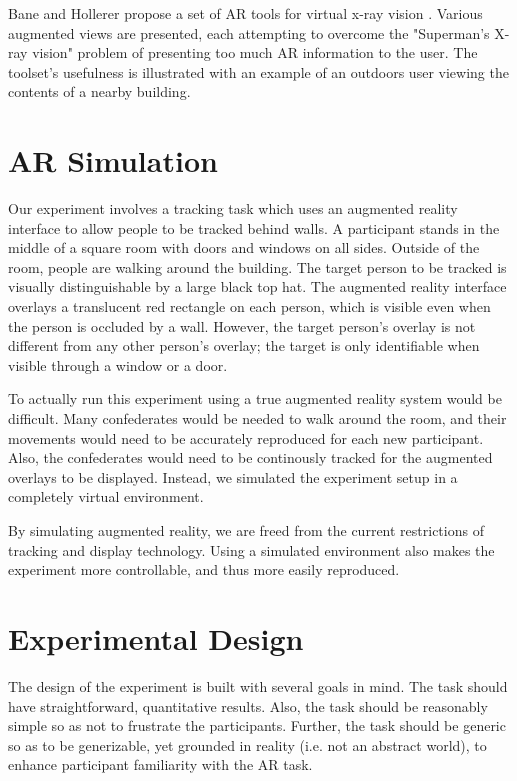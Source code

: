\documentclass{acmsiggraph}                     %
\begin{document}
Bane and Hollerer propose a set of AR tools for virtual x-ray vision \cite{1383060}.  Various augmented views are presented, each attempting to overcome the "Superman's X-ray vision" problem of presenting too much AR information to the user.  The toolset's usefulness is illustrated with an example of an outdoors user viewing the contents of a nearby building.



\section{AR Simulation}

Our experiment involves a tracking task which uses an augmented reality interface to allow people to be tracked behind walls.  A participant stands in the middle of a square room with doors and windows on all sides.  Outside of the room, people are walking around the building.  The target person to be tracked is visually distinguishable by a large black top hat.  The augmented reality interface overlays a translucent red rectangle on each person, which is visible even when the person is occluded by a wall.  However, the target person's overlay is not different from any other person's overlay; the target is only identifiable when visible through a window or a door.

To actually run this experiment using a true augmented reality system would be difficult.  Many confederates would be needed to walk around the room, and their movements would need to be accurately reproduced for each new participant.  Also, the confederates would need to be continously tracked for the augmented overlays to be displayed.  Instead, we simulated the experiment setup in a completely virtual environment.

By simulating augmented reality, we are freed from the current restrictions of tracking and display technology.  Using a simulated environment also makes the experiment more controllable, and thus more easily reproduced.

\section{Experimental Design}

The design of the experiment is built with several goals in mind.  The task should have straightforward, quantitative results.  Also, the task should be reasonably simple so as not to frustrate the participants.  Further, the task should be generic so as to be generizable, yet grounded in reality (i.e. not an abstract world), to enhance participant familiarity with the AR task.
\end{document}

